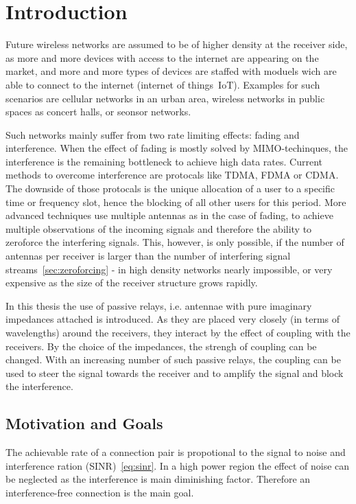 \chapter{Introduction}
\label{sec:introduction}

Future wireless networks are assumed to be of higher density at the receiver side, as more and more devices with access to the internet are appearing on the market, and more and more types of devices are staffed with moduels wich are able to connect to the internet (internet of things~IoT).
Examples for such scenarios are cellular networks in an urban area, wireless networks in public spaces as concert halls, or seonsor networks.

Such networks mainly suffer from two rate limiting  effects: fading and interference.
When the effect of fading is mostly solved by MIMO-techinques, the interference is the remaining bottleneck to achieve high data rates.
Current methods to overcome interference are protocals like TDMA, FDMA or CDMA.
The downside of those protocals is the unique allocation of a user to a specific time or frequency slot, hence the blocking of all other users for this period.
More advanced techniques use multiple antennas as in the case of fading, to achieve multiple observations of the incoming signals and therefore the ability to zeroforce the interfering signals.
This, however, is only possible, if the number of antennas per receiver is larger than the number of interfering signal streams~\ref{sec:zeroforcing}
 - in high density networks nearly impossible, or very expensive as the size of the receiver structure grows rapidly.

In this thesis the use of passive relays, i.e. antennae with pure imaginary impedances attached is introduced.
As they are placed very closely (in terms of wavelengths) around the receivers, they interact by the effect of coupling with the receivers.
By the choice of the impedances, the strengh of coupling can be changed.
With an increasing number of such passive relays, the coupling can be used to steer the signal towards the receiver and to amplify the signal and block the interference.

\section{Motivation and Goals}
\label{sec:motivation}

The achievable rate of a connection pair is propotional to the signal to noise and interference ration (SINR)~\eqref{eq:sinr}.
In a high power region the effect of noise can be neglected as the interference is main diminishing factor.
Therefore an interference-free connection is the main goal.

